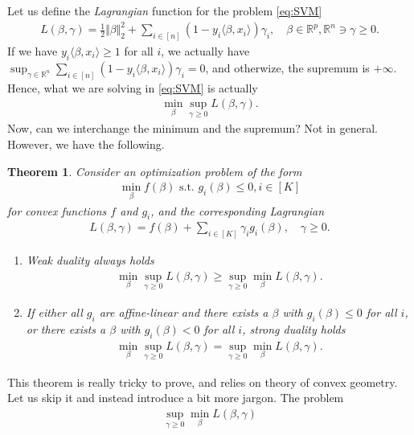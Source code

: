 \documentclass{article}
\newcommand{\sprod}[1]{\langle #1 \rangle}
\newcommand{\R}{\mathbb{R}}
\newtheorem{theorem}{Theorem}
\newcommand{\norm}[1]{\Vert #1 \Vert}
\begin{document}
Let us define the  \emph{Lagrangian} function for the problem \eqref{eq:SVM}
\begin{align*}
    L(\beta, \gamma) = \tfrac{1}{2}\norm{\beta}_2^2 + \sum_{i\in [n]}(1-y_i\sprod{\beta,x_i})\gamma_i, \quad \beta \in \R^p, \R^n \ni \gamma \geq 0.
\end{align*}
If we have $y_i\sprod{\beta,x_i}\geq 1$ for all $i$, we actually have $\sup_{\gamma \in \R^n} \sum_{i\in [n]}(1-y_i\sprod{\beta,x_i})\gamma_i =0$, and otherwize, the supremum is $+\infty$. Hence, what we are solving in \eqref{eq:SVM} is actually
\begin{align*}
    \min_{\beta}\sup_{\gamma\geq 0} L(\beta,\gamma).
\end{align*}
Now, can we interchange the minimum and the supremum? Not in general. However, we have the following.
\begin{theorem}
    Consider an optimization problem of the form
    \begin{align*}
        \min_{\beta} f(\beta) \text{ s.t. } g_i(\beta) \leq 0, i\in [K]
    \end{align*}
    for convex functions $f$ and $g_i$, and the corresponding Lagrangian
    \begin{align*}
        L(\beta,\gamma) = f(\beta) + \sum_{i \in [K]}\gamma_i g_i(\beta), \quad  \gamma \geq 0.
    \end{align*}
    \begin{enumerate}
        \item \emph{Weak duality} always holds
        \begin{align*}
            \min_\beta \sup_{\gamma \geq 0} L(\beta,\gamma) \geq \sup_{\gamma\geq 0 }\min_{\beta} L(\beta,\gamma).
        \end{align*}
        \item If either all $g_i$ are affine-linear and there exists a $\beta$ with $g_i(\beta)\leq 0$ for all $i$, \emph{or} there exists a $\beta$ with $g_i(\beta)<0$ for all $i$, \emph{strong duality} holds
        \begin{align*}
            \min_\beta \sup_{\gamma \geq 0} L(\beta,\gamma) = \sup_{\gamma\geq 0}\min_{\beta} L(\beta,\gamma).
        \end{align*}
    \end{enumerate}
\end{theorem}
This theorem is really tricky to prove, and relies on theory of convex geometry. Let us skip it and instead introduce a bit more jargon. The  problem
\begin{align*}
    \sup_{\gamma\geq 0 }\min_{\beta} L(\beta,\gamma)
\end{align*}
\end{document}
